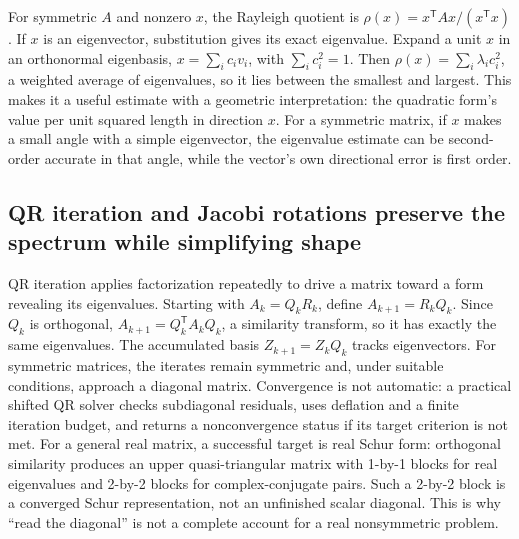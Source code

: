 For symmetric \(A\) and nonzero \(x\), the Rayleigh quotient is \(\rho(x)=x^\mathsf TAx/(x^\mathsf Tx)\). If \(x\) is an eigenvector, substitution gives its exact eigenvalue. Expand a unit \(x\) in an orthonormal eigenbasis, \(x=\sum_i c_i v_i\), with \(\sum_i c_i^2=1\). Then \(\rho(x)=\sum_i\lambda_i c_i^2\), a weighted average of eigenvalues, so it lies between the smallest and largest. This makes it a useful estimate with a geometric interpretation: the quadratic form's value per unit squared length in direction \(x\). For a symmetric matrix, if \(x\) makes a small angle with a simple eigenvector, the eigenvalue estimate can be second-order accurate in that angle, while the vector's own directional error is first order.

\subsection{QR iteration and Jacobi rotations preserve the spectrum while simplifying shape}\label{01-foundations-i-ch020-qr-iteration-and-jacobi-rotations-preserve-the-spectrum-while-simplifying-shape}

\hypertarget{01-foundations-i-ch020-qr-iteration-and-jacobi-rotations-preserve-the-spectrum-while-simplifying-shape}{}

QR iteration applies factorization repeatedly to drive a matrix toward a form revealing its eigenvalues. Starting with \(A_k=Q_kR_k\), define \(A_{k+1}=R_kQ_k\). Since \(Q_k\) is orthogonal, \(A_{k+1}=Q_k^\mathsf TA_kQ_k\), a similarity transform, so it has exactly the same eigenvalues. The accumulated basis \(Z_{k+1}=Z_kQ_k\) tracks eigenvectors. For symmetric matrices, the iterates remain symmetric and, under suitable conditions, approach a diagonal matrix. Convergence is not automatic: a practical shifted QR solver checks subdiagonal residuals, uses deflation and a finite iteration budget, and returns a nonconvergence status if its target criterion is not met. For a general real matrix, a successful target is real Schur form: orthogonal similarity produces an upper quasi-triangular matrix with 1-by-1 blocks for real eigenvalues and 2-by-2 blocks for complex-conjugate pairs. Such a 2-by-2 block is a converged Schur representation, not an unfinished scalar diagonal. This is why ``read the diagonal'' is not a complete account for a real nonsymmetric problem.

